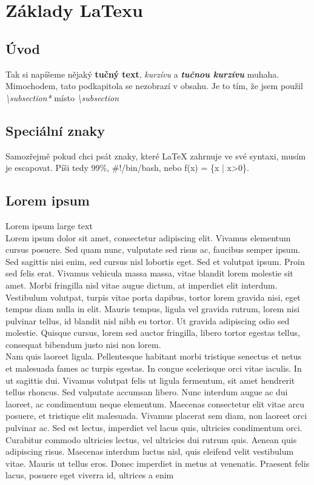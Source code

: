\documentclass[10pt,a4paper]{article}
\begin{document}
	\tableofcontents
	\newpage

	\section{Základy LaTexu}	
	\subsection*{Úvod}	
	Tak si napíšeme nějaký \textbf{tučný text}, \textit{kurzívu} a \textbf{\textit{tučnou kurzívu}} muhaha. Mimochodem, tato podkapitola se nezobrazí v obsahu. Je to tím, že jsem použil \textit{\textbackslash{}subsection*} místo \textit{\textbackslash{}subsection}\\
	
	\subsection{Speciální znaky}
	Samozřejmě pokud chci psát znaky, které LaTeX zahrnuje ve své syntaxi, musím je escapovat. Píši tedy 99\%, \#!/bin/bash, nebo f(x) = \{x | x>0\}.
	
	\subsection{Lorem ipsum}
	\Large{Lorem ipsum large text}\normalsize \\
	Lorem ipsum dolor sit amet, consectetur adipiscing elit. Vivamus elementum cursus posuere. Sed quam nunc, vulputate sed risus ac, faucibus semper ipsum. Sed sagittis nisi enim, sed cursus nisl lobortis eget. Sed et volutpat ipsum. Proin sed felis erat. Vivamus vehicula massa massa, vitae blandit lorem molestie sit amet. Morbi fringilla nisl vitae augue dictum, at imperdiet elit interdum. Vestibulum volutpat, turpis vitae porta dapibus, tortor lorem gravida nisi, eget tempus diam nulla in elit. Mauris tempus, ligula vel gravida rutrum, lorem nisi pulvinar tellus, id blandit nisl nibh eu tortor. Ut gravida adipiscing odio sed molestie. Quisque cursus, lorem sed auctor fringilla, libero tortor egestas tellus, consequat bibendum justo nisi non lorem.\\

	Nam quis laoreet ligula. Pellentesque habitant morbi tristique senectus et netus et malesuada fames ac turpis egestas. In congue scelerisque orci vitae iaculis. In ut sagittis dui. Vivamus volutpat felis ut ligula fermentum, sit amet hendrerit tellus rhoncus. Sed vulputate accumsan libero. Nunc interdum augue ac dui laoreet, ac condimentum neque elementum. Maecenas consectetur elit vitae arcu posuere, et tristique elit malesuada. Vivamus placerat sem diam, non laoreet orci pulvinar ac. Sed est lectus, imperdiet vel lacus quis, ultricies condimentum orci. Curabitur commodo ultricies lectus, vel ultricies dui rutrum quis. Aenean quis adipiscing risus. Maecenas interdum luctus nisl, quis eleifend velit vestibulum vitae. Mauris ut tellus eros. Donec imperdiet in metus at venenatis. Praesent felis lacus, posuere eget viverra id, ultrices a enim
	
\end{document}
